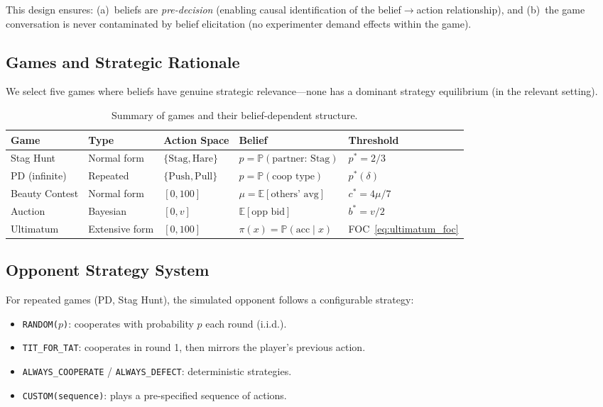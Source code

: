 \documentclass[12pt]{article}
\newcommand{\E}{\mathbb{E}}
\newcommand{\Prob}{\mathbb{P}}
\begin{document}
This design ensures: (a)~beliefs are \emph{pre-decision} (enabling causal identification of the belief$\to$action relationship), and (b)~the game conversation is never contaminated by belief elicitation (no experimenter demand effects within the game).


\subsection{Games and Strategic Rationale}
\label{sec:games}

We select five games where beliefs have genuine strategic relevance---none has a dominant strategy equilibrium (in the relevant setting).

\begin{table}[h]
\centering
\caption{Summary of games and their belief-dependent structure.}
\label{tab:games}
\begin{tabular}{@{}lllll@{}}
\toprule
Game & Type & Action Space & Belief & Threshold \\
\midrule
Stag Hunt & Normal form & $\{\text{Stag}, \text{Hare}\}$ & $p = \Prob(\text{partner: Stag})$ & $p^* = 2/3$ \\
PD (infinite) & Repeated & $\{\text{Push}, \text{Pull}\}$ & $p = \Prob(\text{coop type})$ & $p^*(\delta)$ \\
Beauty Contest & Normal form & $[0, 100]$ & $\mu = \E[\text{others' avg}]$ & $c^* = 4\mu/7$ \\
Auction & Bayesian & $[0, v]$ & $\E[\text{opp bid}]$ & $b^* = v/2$ \\
Ultimatum & Extensive form & $[0, 100]$ & $\pi(x) = \Prob(\text{acc} \mid x)$ & FOC~\eqref{eq:ultimatum_foc} \\
\bottomrule
\end{tabular}
\end{table}


\subsection{Opponent Strategy System}
\label{sec:opponents}

For repeated games (PD, Stag Hunt), the simulated opponent follows a configurable strategy:
\begin{itemize}[nosep]
    \item \texttt{RANDOM($p$)}: cooperates with probability $p$ each round (i.i.d.).
    \item \texttt{TIT\_FOR\_TAT}: cooperates in round 1, then mirrors the player's previous action.
    \item \texttt{ALWAYS\_COOPERATE} / \texttt{ALWAYS\_DEFECT}: deterministic strategies.
    \item \texttt{CUSTOM(sequence)}: plays a pre-specified sequence of actions.
\end{itemize}
\end{document}
